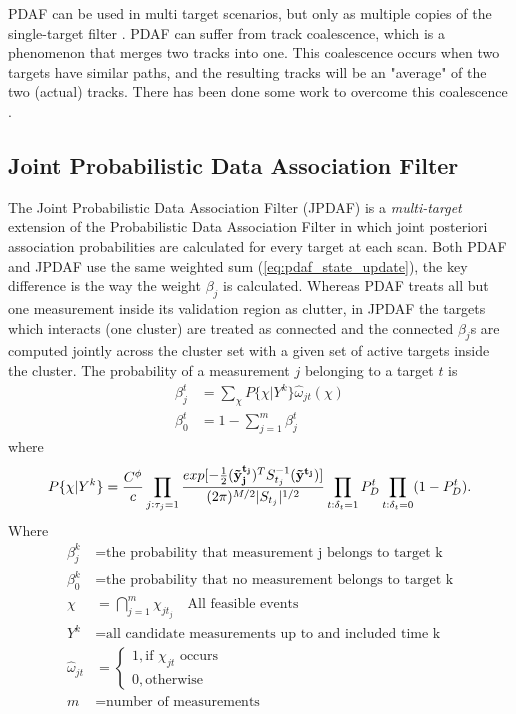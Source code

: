 PDAF can be used in multi target scenarios, but only as multiple copies of the single-target filter \cite{Fortmann1983}. PDAF can suffer from track coalescence, which is a phenomenon that merges two tracks into one. This coalescence occurs when two targets have similar paths, and the resulting tracks will be an "average" of the two (actual) tracks. There has been done some work to overcome this coalescence \cite{Blom2000}.



\subsection{Joint Probabilistic Data Association Filter}
\label{sec:jpdaf}
The Joint Probabilistic Data Association Filter (JPDAF) is a \emph{multi-target} extension of the Probabilistic Data Association Filter in which joint posteriori association probabilities are calculated for every target at each scan. Both PDAF and JPDAF use the same weighted sum (\ref{eq:pdaf_state_update}), the key difference is the way the weight $ \beta_j $ is calculated. Whereas PDAF treats all but one measurement inside its validation region as clutter, in JPDAF the targets which interacts (one cluster) are treated as connected and the connected $ \beta_j $s are computed jointly across the cluster set with a given set of active targets inside the cluster. The probability of a measurement $j$ belonging to a target
$ t $ is \cite{Fortmann1983}
\begin{equation}
\begin{split}
\beta_j^t &= \sum_{\chi} P\{ \chi | Y^k \} \hat{\omega}_{jt}(\chi) \\
\beta_0^t &= 1 - \sum_{j=1}^m \beta_j^t
\end{split}
\end{equation}
where
\begin{equation}
P\{\chi|Y^k\} = \frac{C^\phi}{c} 
				\prod_{j:\tau_j=1} \frac{exp[-\frac{1}{2}(\boldsymbol{\mathbf{\tilde{y}_j^{t_j}}})^T S_{t_j}^{-1}(\boldsymbol{\mathbf{\tilde{y}^{t_j}}})]}{(2\pi)^{M/2} |S_{t_j}|^{1/2}}
				\prod_{t:\delta_t=1} P_D^t
				\prod_{t:\delta_t=0} (1 - P_D^t).
\end{equation}
Where 
\begin{equation*}
\begin{split}
	\beta_j^k			&= \text{the probability that measurement j belongs to target k} \\
	\beta_0^k 			&= \text{the probability that no measurement belongs to target k} \\
	\chi 				&= \bigcap\limits_{j=1}^{m} \chi_{j t_j} \quad \text{All feasible events} \\
	Y^k 				&= \text{all candidate measurements up to and included time k} \\
	\hat{\omega}_{jt}	&=	\begin{cases}
								1, \text{if } \chi_{jt} \text{ occurs} \\ 
								0, \text{otherwise} 
							\end{cases} \\
	m					&= \text{number of measurements}
\end{split}
\end{equation*}
